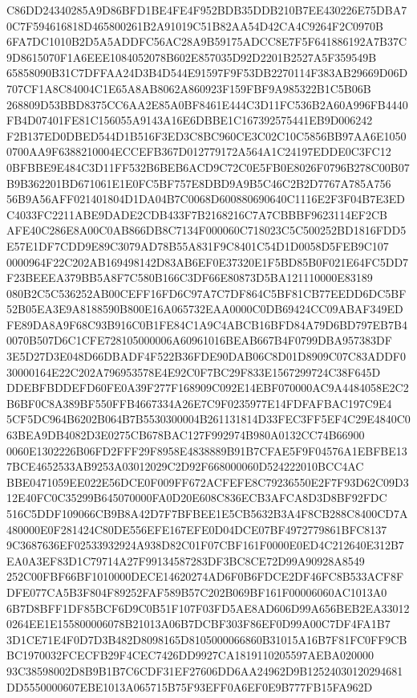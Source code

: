 \documentclass[UTF8,fontset=fandol,zihao=-4,a4paper]{ctexart}
\begin{document}
{{C86DD24340285A9D86BFD1BE4FE4F952BDB35DDB210B7EE430226E75DBA70C7F594616818D465800261B2A91019C51B82AA54D42CA4C9264F2C0970B
6FA7DC1010B2D5A5ADDFC56AC28A9B59175ADCC8E7F5F641886192A7B37C9D8615070F1A6EEE1084052078B602E857035D92D2201B2527A5F359549B
65858090B31C7DFFAA24D3B4D544E91597F9F53DB2270114F383AB29669D06D707CF1A8C84004C1E65A8AB8062A860923F159FBF9A985322B1C5B06B
268809D53BBD8375CC6AA2E85A0BF8461E444C3D11FC536B2A60A996FB4440FB4D07401FE81C156055A9143A16E6DBBE1C167392575441EB9D006242
F2B137ED0DBED544D1B516F3ED3C8BC960CE3C02C10C5856BB97AA6E10500700AA9F6388210004ECCEFB367D012779172A564A1C24197EDDE0C3FC12
0BFBBE9E484C3D11FF532B6BEB6ACD9C72C0E5FB0E8026F0796B278C00B07B9B362201BD671061E1E0FC5BF757E8DBD9A9B5C46C2B2D7767A785A756
56B9A56AFF021401804D1DA04B7C0068D600880690640C1116E2F3F04B7E3EDC4033FC2211ABE9DADE2CDB433F7B2168216C7A7CBBBF9623114EF2CB
AFE40C286E8A00C0AB866DB8C7134F000060C718023C5C500252BD1816FDD5E57E1DF7CDD9E89C3079AD78B55A831F9C8401C54D1D0058D5FEB9C107
0000964F22C202AB169498142D83AB6EF0E37320E1F5BD85B0F021E64FC5DD7F23BEEEA379BB5A8F7C580B166C3DF66E80873D5BA121110000E83189
080B2C5C536252AB00CEFF16FD6C97A7C7DF864C5BF81CB77EEDD6DC5BF52B05EA3E9A8188590B800E16A065732EAA0000C0DB69424CC09ABAF349ED
FE89DA8A9F68C93B916C0B1FE84C1A9C4ABCB16BFD84A79D6BD797EB7B40070B507D6C1CFE728105000006A60961016BEAB667B4F0799DBA957383DF
3E5D27D3E048D66DBADF4F522B36FDE90DAB06C8D01D8909C07C83ADDF030000164E22C202A796953578E4E92C0F7BC29F833E1567299724C38F645D
DDEBFBDDEFD60FE0A39F277F168909C092E14EBF070000AC9A4484058E2C2B6BF0C8A389BF550FFB4667334A26E7C9F0235977E14FDFAFBAC197C9E4
5CF5DC964B6202B064B7B5530300004B261131814D33FEC3FF5EF4C29E4840C063BEA9DB4082D3E0275CB678BAC127F992974B980A0132CC74B66900
0060E1302226B06FD2FFF29F8958E4838889B91B7CFAE5F9F04576A1EBFBE137BCE4652533AB9253A03012029C2D92F668000060D524222010BCC4AC
BBE0471059EE022E56DCE0F009FF672ACFEFE8C79236550E2F7F93D62C09D312E40FC0C35299B645070000FA0D20E608C836ECB3AFCA8D3D8BF92FDC
516C5DDF109066CB9B8A42D7F7BFBEE1E5CB5632B3A4F8CB288C8400CD7A480000E0F281424C80DE556EFE167EFE0D04DCE07BF4972779861BFC8137
9C3687636EF02533932924A938D82C01F07CBF161F0000E0ED4C212640E312B7EA0A3EF83D1C79714A27F99134587283DF3BC8CE72D99A90928A8549
252C00FBF66BF1010000DECE14620274AD6F0B6FDCE2DF46FC8B533ACF8FDFE077CA5B3F804F89252FAF589B57C202B069BF161F00006060AC1013A0
6B7D8BFF1DF85BCF6D9C0B51F107F03FD5AE8AD606D99A656BEB2EA330120264EE1E155800006078B21013A06B7DCBF303F86EF0D99A00C7DF4FA1B7
3D1CE71E4F0D7D3B482D8098165D8105000066860B31015A16B7F81FC0FF9CBBC1970032FCECFB29F4CEC7426DD9927CA1819110205597AEBA020000
93C38598002D8B9B1B7C6CDF31EF27606DD6AA24962D9B12524030120294681DD5550000607EBE1013A065715B75F93EFF0A6EF0E9B777FB15FA962D
}}
\end{document}
